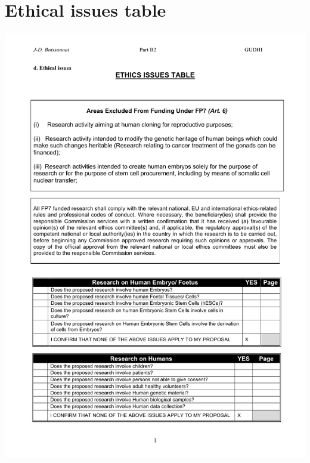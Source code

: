 \documentclass[a4paper, 11pt]{article}
\begin{document}


\section{Ethical issues table}

\begin{center}
\includegraphics[width=\textwidth]{ethics1}
\end{center}
\end{document}
